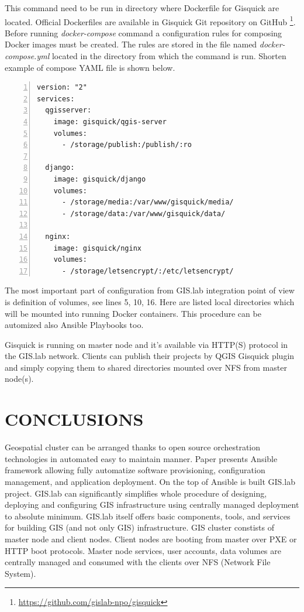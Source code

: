 \documentclass{isprs}
\begin{document}
This command need to be run in directory where Dockerfile for Gisquick
are located. Official Dockerfiles are available in Gisquick Git
repository on GitHub
\footnote{\url{https://github.com/gislab-npo/gisquick}}. Before
running \textit{docker-compose} command a configuration rules for
composing Docker images must be created. The rules are stored in the
file named \textit{docker-compose.yml} located in the directory from
which the command is run. Shorten example of compose YAML file is
shown below.

\begin{lstlisting}[numbers=left,xleftmargin=1em]
version: "2"
services:
  qgisserver:
    image: gisquick/qgis-server
    volumes:
      - /storage/publish:/publish/:ro

  django:
    image: gisquick/django
    volumes:
      - /storage/media:/var/www/gisquick/media/
      - /storage/data:/var/www/gisquick/data/

  nginx:
    image: gisquick/nginx
    volumes:
      - /storage/letsencrypt/:/etc/letsencrypt/
\end{lstlisting}

The most important part of configuration from GIS.lab integration
point of view is definition of volumes, see lines 5, 10, 16. Here are
listed local directories which will be mounted into running Docker
containers. This procedure can be automized also Ansible Playbooks
too.

Gisquick is running on master node and it's available via HTTP(S)
protocol in the GIS.lab network. Clients can publish their projects by
QGIS Gisquick plugin and simply copying them to shared directories
mounted over NFS from master node(s).

\section{CONCLUSIONS}

Geospatial cluster can be arranged thanks to open source orchestration
technologies in automated easy to maintain manner. Paper presents
Ansible framework allowing fully automatize software provisioning,
configuration management, and application deployment. On the top of
Ansible is built GIS.lab project. GIS.lab can significantly simplifies
whole procedure of designing, deploying and configuring GIS
infrastructure using centrally managed deployment to absolute
minimum. GIS.lab itself offers basic components, tools, and services
for building GIS (and not only GIS) infrastructure. GIS cluster
constists of master node and client nodes. Client nodes are booting
from master over PXE or HTTP boot protocols. Master node services,
user accounts, data volumes are centrally managed and consumed with
the clients over NFS (Network File System).
\end{document}

